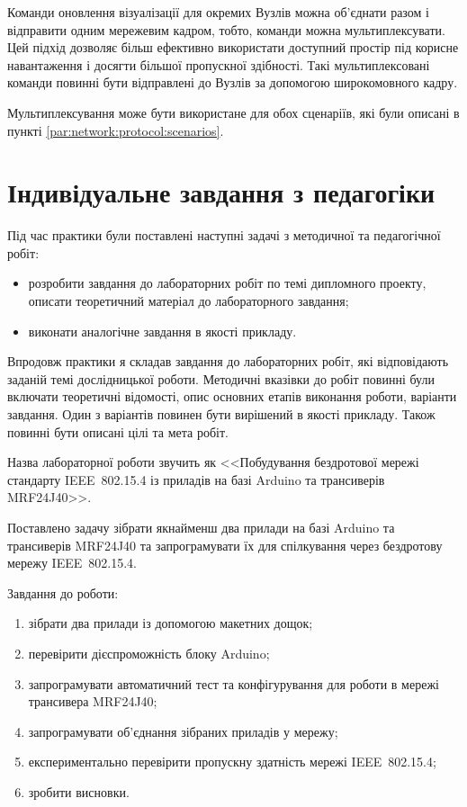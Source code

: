 \documentclass[a4paper,ukrainian,utf8,nocolumnsxix,floatsection]{eskdtext}
\let\stdsection\section
\renewcommand\section{\clearpage\stdsection}
\newcommand{\iee}[0]{IEEE~802.15.4\xspace}
\begin{document}
Команди оновлення візуалізації для окремих Вузлів можна об’єднати разом і відправити одним мережевим кадром, тобто, команди можна мультиплексувати. Цей підхід дозволяє більш ефективно використати доступний простір під корисне навантаження і досягти більшої пропускної здібності. Такі мультиплексовані команди повинні бути відправлені до Вузлів за допомогою широкомовного кадру.

Мультиплексування може бути використане для обох сценаріїв, які були описані в пункті \ref{par:network:protocol:scenarios}.


\section{Індивідуальне завдання з педагогіки}

Під час практики були поставлені наступні задачі з методичної та педагогічної робіт:
\begin{itemize}
	\item розробити завдання до лабораторних робіт по темі дипломного проекту, описати теоретичний матеріал до лабораторного завдання;
	\item виконати аналогічне завдання в якості прикладу.
\end{itemize}

Впродовж практики я складав завдання до лабораторних робіт, які відповідають заданій темі дослідницької роботи. Методичні вказівки до робіт повинні були включати теоретичні відомості, опис основних етапів виконання роботи, варіанти завдання. Один з варіантів повинен бути вирішений в якості прикладу. Також повинні бути описані цілі та мета робіт.

Назва лабораторної роботи звучить як <<Побудування бездротової мережі стандарту \iee із приладів на базі Arduino та трансиверів MRF24J40>>.

Поставлено задачу зібрати якнайменш два прилади на базі Arduino та трансиверів MRF24J40 та запрограмувати їх для спілкування через бездротову мережу \iee. 


Завдання до роботи:
\begin{enumerate}
	\item зібрати два прилади із допомогою макетних дощок;
	\item перевірити дієспроможність блоку Arduino;
	\item запрограмувати автоматичний тест та конфігурування для роботи в мережі трансивера MRF24J40;
	\item запрограмувати об'єднання зібраних приладів у мережу;
	\item експериментально перевірити пропускну здатність мережі \iee;
	\item зробити висновки. 
\end{enumerate}
\end{document}
